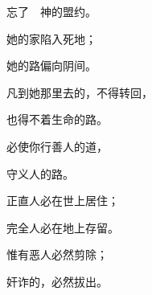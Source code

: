 {\par }{\Q 忘了　神的盟约。
\par }{\Q {}她的家陷入死地；
\par }{\Q 她的路偏向阴间。
\par }{\Q {}凡到她那里去的，不得转回，
\par }{\Q 也得不着生命的路。
\par }{\BB \par }{\Q {}必使你行善人的道，
\par }{\Q 守义人的路。
\par }{\Q {}正直人必在世上居住；
\par }{\Q 完全人必在地上存留。
\par }{\Q {}惟有恶人必然剪除；
\par }{\Q 奸诈的，必然拔出。

}
